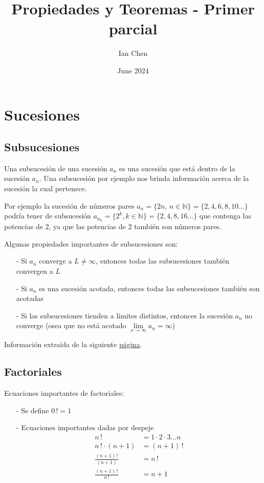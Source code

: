 \documentclass{article}
\title{Propiedades y Teoremas - Primer parcial}
\author{Ian Chen}
\date{June 2024}
\begin{document}

\section{Sucesiones}
\subsection{Subsucesiones}
Una subsucesión de una sucesión $\displaystyle a_n$ es una sucesión que está dentro de la sucesión $a_n$.
Una subsucesión por ejemplo nos brinda información acerca de la sucesión la cual pertenece. 

Por ejemplo la sucesión de números pares $a_n = \{2n ,\, n \in \mathbb{N} \} = \{2, 4, 6, 8, 10 \dots \}$ podría tener de subsucesión $a_{n_k} = \{2^k, k \in \mathbb{N}\} = \{2, 4, 8, 16\dots \}$ que contenga las potencias de 2, ya que las potencias de 2 también son números pares.

Algunas propiedades importantes de subsucesiones son:
\begin{itemize}
    \item[-] Si $a_n$ converge a $L \neq \infty$, entonces todas las subsucesiones también convergen a $L$
    \item[-] Si $a_n$ es una sucesión acotada, entonces todas las subsucesiones también son acotadas
    \item[-] Si las subsucesiones tienden a límites distintos, entonces la sucesión $a_n$ no converge (osea que no está acotado $\displaystyle \lim \limits_{x \to \infty}a_n=\infty$)
\end{itemize}
Información extraída de la siguiente \href{https://www.matesfacil.com/BAC/progresiones/subsucesion-sucesion-parcial-convergente-propiedades-ejemplos-limites-problemas-resueltos.html}{página}.

\vspace{0.5cm}
\subsection{Factoriales}
Ecuaciones importantes de factoriales:
\begin{itemize}
    \item[-] Se define $0\,! = 1$
    \item[-] Ecuaciones importantes dadas por despeje 
    \begin{align*}
        n\,! &= 1 \cdot 2 \cdot 3 \dots n \\[6pt]
        n\,! \cdot (n+1) &= (n+1)\,! \\[6pt]
        \frac{(n+1)\,!}{(n+1)} &= n\,! \\[6pt]
        \frac{(n+1)\,!}{n\,!} &= n+1
    \end{align*}
\end{itemize}
\end{document}
